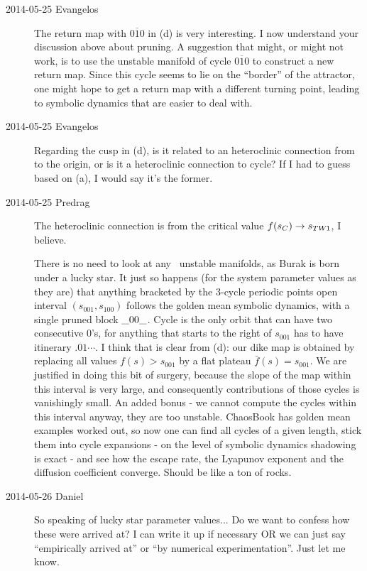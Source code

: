 \begin{description}
\item[2014-05-25 Evangelos] The return map with $\overline{010}$  in
(d) is very interesting. I now
understand your discussion above about pruning. A suggestion that might, or might not
work, is to use the unstable manifold of cycle $\overline{010}$ to construct a
new return map. Since this cycle seems to lie on the ``border'' of the attractor,
one might hope to get a return map with a different turning point, leading to
symbolic dynamics that are easier to deal with.

\item[2014-05-25 Evangelos] Regarding the cusp in (d), is it
related to an heteroclinic connection from  to the origin, or is it a
heteroclinic connection to cycle? If I had to guess based on (a),
I would say it's the former.

\item[2014-05-25 Predrag] The heteroclinic connection is from the
critical value $f(s_{C}) \to  s_{TW_{}1}$, I believe.

There is no need to look at any \po\ unstable manifolds, as Burak is born
under a lucky star. It just so happens (for the system parameter values
as they are) that anything bracketed by the 3-cycle periodic points open
interval $(s_{001},s_{100})$ follows the golden mean symbolic dynamics,
with a single pruned block $\_{00}\_$. Cycle  is the only
orbit that can have two consecutive 0's, for anything that starts to the
right of $s_{001}$ has to have itinerary $.01\cdots$. I think that is
clear from (d): our dike map is obtained by
replacing all values $f(s) > s_{001}$ by a flat plateau $\bar{f}(s) =
s_{001}$. We are justified in doing this bit of surgery, because the
slope of the map within this interval is very large, and consequently
contributions of those cycles is vanishingly small. An added bonus - we
cannot compute the cycles within this interval anyway, they are too
unstable. ChaosBook has golden mean examples worked out, so now one can
find all cycles of a given length, stick them into cycle expansions - on
the level of symbolic dynamics shadowing is exact - and see how the
escape rate, the Lyapunov exponent and the diffusion coefficient
converge. Should be like a ton of rocks.

\item[2014-05-26 Daniel] So speaking of lucky star parameter values... Do we want
to confess how these were arrived at? I can write it up if necessary OR we can just
say ``empirically arrived at'' or ``by numerical experimentation''. Just let me know.


\end{description}
